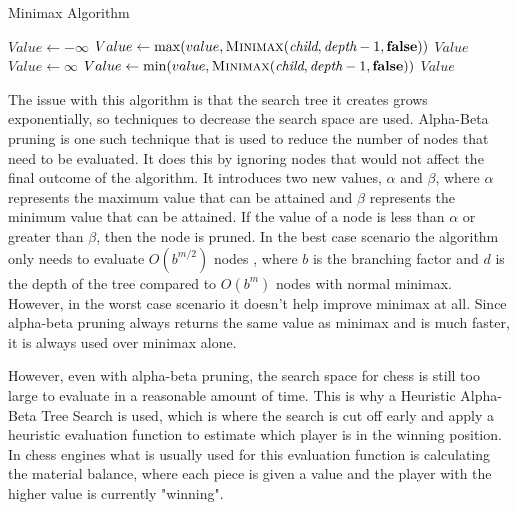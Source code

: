 \begin{algorithm}[h]
    \caption{Minimax Algorithm}
    \begin{algorithmic}
        \State \Return {}
        \EndIf
        \State $Value \gets -\infty$
        \State $Value \gets \max(value, \textsc{Minimax}(\textit{child}, \textit{depth} - 1, \textbf{false}))$
        \EndFor
        \State \Return $Value$
        \Else
        \State $Value \gets \infty$
        \State $Value \gets \min(value, \textsc{Minimax}(\textit{child}, \textit{depth} - 1, \textbf{false}))$
        \EndFor
        \State \Return $Value$
        \EndIf
        \EndFunction
    \end{algorithmic}
\end{algorithm}
The issue with this algorithm is that the search tree it creates grows exponentially, so techniques to decrease the search space are used. Alpha-Beta pruning is one such technique that is used to reduce the number of nodes that need to be evaluated. It does this by ignoring nodes that would not affect the final outcome of the algorithm. It introduces two new values, ${\alpha}$ and ${\beta}$, where ${\alpha}$ represents the maximum value that can be attained and ${\beta}$ represents the minimum value that can be attained. If the value of a node is less than ${\alpha}$ or greater than ${\beta}$, then the node is pruned. In the best case scenario the algorithm only needs to evaluate ${O(b^{m/2})}$ nodes \cite{russellArtificialIntelligenceModern2022}, where ${b}$ is the branching factor and ${d}$ is the depth of the tree compared to ${O(b^m)}$ nodes with normal minimax. However, in the worst case scenario it doesn't help improve minimax at all. Since alpha-beta pruning always returns the same value as minimax and is much faster, it is always used over minimax alone.

However, even with alpha-beta pruning, the search space for chess is still too large to evaluate in a reasonable amount of time.  This is why a Heuristic Alpha-Beta Tree Search is used, which is where the search is cut off early and apply a heuristic evaluation function to estimate which player is in the winning position. In chess engines what is usually used for this evaluation function is calculating the material balance, where each piece is given a value and the player with the higher value is currently "winning".

